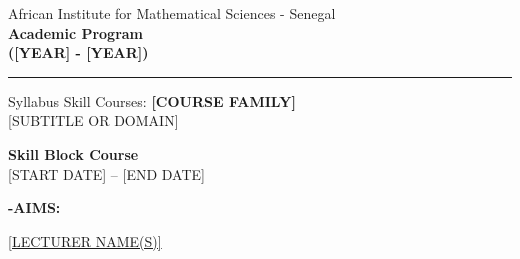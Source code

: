 \documentclass[11pt,a4paper]{article}
\begin{document}
\begin{titlepage}
    \thispagestyle{fancy}
    
    \vspace*{3cm}
    \begin{tcolorbox}[colframe=AIMSred, colback=white, boxrule=0.5mm, arc=0mm, leftrule=2mm, rightrule=0.5mm, toprule=0.5mm, bottomrule=0.5mm]
        {\color{AIMSred} \large African Institute for Mathematical Sciences - Senegal}\\[0.5cm]
        {\Huge \color{AIMSred} \textbf{Academic Program}}\\[0.2cm]
        {\Huge \color{AIMSred} \textbf{([YEAR] - [YEAR])}}\\[0.5cm]
        \hrule
        \vspace{0.2cm}
        {\large Syllabus Skill Courses: \textbf{[COURSE FAMILY]} \\[0.2cm] [SUBTITLE OR DOMAIN]}
    \end{tcolorbox}
    
    \vspace{1.5cm}
    {\Huge \textbf{Skill Block Course}}\\[0.3cm]
    {\large [START DATE] -- [END DATE]}\\[1cm]
    
    \begin{flushleft}
    {\Large \textbf{{\color{AIMSred}{[COURSE CODE]}}-AIMS: {\color{AIMSred}{[FULL COURSE TITLE]}}}}
    \end{flushleft}

    \vspace{1.9cm}
    {\Large \href{https://your-website.com/}{[LECTURER NAME(S)]}}\\[2cm]
\end{titlepage}

\newpage
\tableofcontents
\newpage


\end{document}
